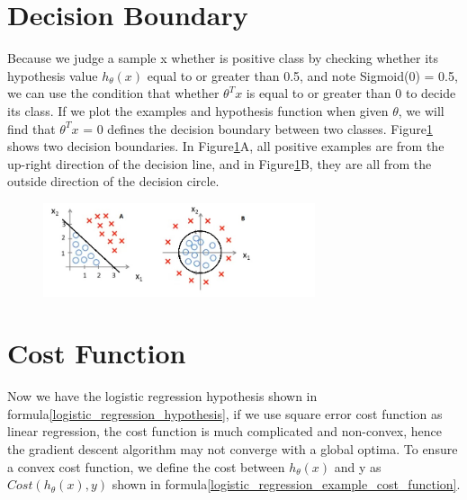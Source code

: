\documentclass{article}
\begin{document}
\section{Decision Boundary}
Because we judge a sample x whether is positive class by checking whether its hypothesis value $h_{\theta}(x)$ equal to or greater than 0.5, and note Sigmoid(0) = 0.5, we can use the condition that whether $\theta^{T}x$ is equal to or greater than 0 to decide its class. If we plot the examples and hypothesis function when given $\theta$, we will find that $\theta^{T}x$ = 0 defines the decision boundary between two classes. Figure\ref{decision_boundary} shows two decision boundaries. In Figure\ref{decision_boundary}A, all positive examples are from the up-right direction of the decision line, and in Figure\ref{decision_boundary}B, they are all from the outside direction of the decision circle.

\begin{figure}[ht]
  \centering
  \includegraphics[width=8cm]{Figure3.jpg}\\
  \caption{}\label{decision_boundary}
\end{figure}

\section{Cost Function}
Now we have the logistic regression hypothesis shown in formula\ref{logistic_regression_hypothesis}, if we use square error cost function as linear regression, the cost function is much complicated and non-convex, hence the gradient descent algorithm may not converge with a global optima. To ensure a convex cost function, we define the cost between $h_{\theta}(x)$ and y as $Cost(h_{\theta}(x), y)$ shown in formula\ref{logistic_regression_example_cost_function}.
\end{document}
